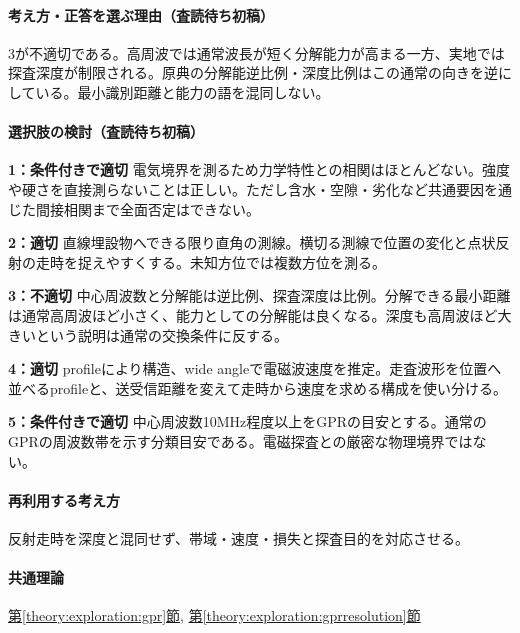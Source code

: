 \paragraph{考え方・正答を選ぶ理由（査読待ち初稿）} 3が不適切である。高周波では通常波長が短く分解能力が高まる一方、実地では探査深度が制限される。原典の分解能逆比例・深度比例はこの通常の向きを逆にしている。最小識別距離と能力の語を混同しない。

\paragraph{選択肢の検討（査読待ち初稿）}\mbox{}\par

\noindent\textbf{1：条件付きで適切} 電気境界を測るため力学特性との相関はほとんどない。強度や硬さを直接測らないことは正しい。ただし含水・空隙・劣化など共通要因を通じた間接相関まで全面否定はできない。\par

\noindent\textbf{2：適切} 直線埋設物へできる限り直角の測線。横切る測線で位置の変化と点状反射の走時を捉えやすくする。未知方位では複数方位を測る。\par

\noindent\textbf{3：不適切} 中心周波数と分解能は逆比例、探査深度は比例。分解できる最小距離は通常高周波ほど小さく、能力としての分解能は良くなる。深度も高周波ほど大きいという説明は通常の交換条件に反する。\par

\noindent\textbf{4：適切} profileにより構造、wide angleで電磁波速度を推定。走査波形を位置へ並べるprofileと、送受信距離を変えて走時から速度を求める構成を使い分ける。\par

\noindent\textbf{5：条件付きで適切} 中心周波数10MHz程度以上をGPRの目安とする。通常のGPRの周波数帯を示す分類目安である。電磁探査との厳密な物理境界ではない。\par

\paragraph{再利用する考え方} 反射走時を深度と混同せず、帯域・速度・損失と探査目的を対応させる。

\paragraph{共通理論} \hyperref[theory:exploration:gpr]{第\ref*{theory:exploration:gpr}節}, \hyperref[theory:exploration:gprresolution]{第\ref*{theory:exploration:gprresolution}節}

